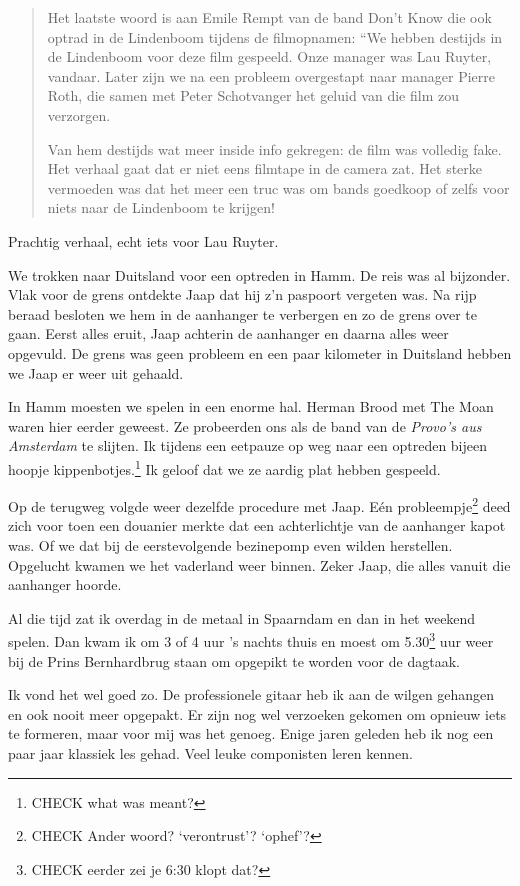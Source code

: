 \documentclass[10pt,twoside,openright]{memoir}
\begin{document}
\begin{quote}
Het laatste woord is aan Emile Rempt van de band Don’t Know die ook optrad in de Lindenboom tijdens de filmopnamen: “We hebben destijds in de Lindenboom voor deze film gespeeld. Onze manager was Lau Ruyter, vandaar. Later zijn we na een probleem overgestapt naar manager Pierre Roth, die samen met Peter Schotvanger het geluid van die film zou verzorgen.

Van hem destijds wat meer inside info gekregen: de film was volledig fake. Het verhaal gaat dat er niet eens filmtape in de camera zat. Het sterke vermoeden was dat het meer een truc was om bands goedkoop of zelfs voor niets naar de Lindenboom te krijgen!
\end{quote}

Prachtig verhaal, echt iets voor Lau Ruyter.

We trokken naar Duitsland voor een optreden in Hamm. De reis was al bijzonder. Vlak voor de grens ontdekte Jaap dat hij z’n paspoort vergeten was. Na rijp beraad besloten we hem in de aanhanger te verbergen en zo de grens over te gaan. Eerst alles eruit, Jaap achterin de aanhanger en daarna alles weer opgevuld. De grens was geen probleem en een paar kilometer in Duitsland hebben we Jaap er weer uit gehaald. 

In Hamm moesten we spelen in een enorme hal. Herman Brood met The Moan waren hier eerder geweest. Ze probeerden ons als de band van de \emph{Provo’s aus Amsterdam} te slijten. Ik tijdens een eetpauze op weg naar een optreden bijeen hoopje kippenbotjes.\footnote{CHECK what was meant?} Ik geloof dat we ze aardig plat hebben gespeeld.

Op de terugweg volgde weer dezelfde procedure met Jaap. Eén probleempje\footnote{CHECK Ander woord? `verontrust'? `ophef'?} deed zich voor toen een douanier merkte dat een achterlichtje van de aanhanger kapot was. Of we dat bij de eerstevolgende bezinepomp even wilden herstellen. Opgelucht kwamen we het vaderland weer binnen. Zeker Jaap, die alles vanuit die aanhanger hoorde.

Al die tijd zat ik overdag in de metaal in Spaarndam en dan in het weekend spelen. Dan kwam ik om 3 of 4 uur ’s nachts thuis en moest om 5.30\footnote{CHECK eerder zei je 6:30 klopt dat?} uur weer bij de Prins Bernhardbrug staan om opgepikt te worden voor de dagtaak. 

Ik vond het wel goed zo. De professionele gitaar heb ik aan de wilgen gehangen en ook nooit meer opgepakt. Er zijn nog wel verzoeken gekomen om opnieuw iets te formeren, maar voor mij was het genoeg. Enige jaren geleden heb ik nog een paar jaar klassiek les gehad. Veel leuke componisten leren kennen.
\end{document}
